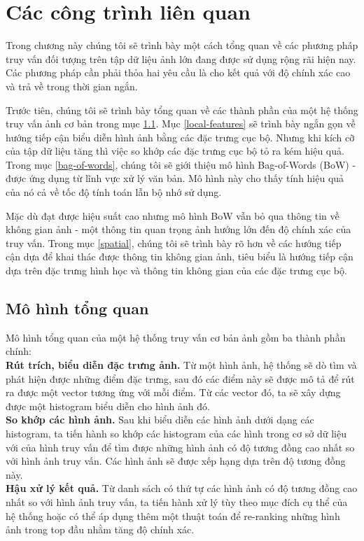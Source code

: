 \chapter{Các công trình liên quan}
\label{chapter:related}
\ifpdf
    \graphicspath{{Chapter2/Chapter2Figs/PNG/}{Chapter2/Chapter2Figs/PDF/}{Chapter2/Chapter2Figs/}}
\else
    \graphicspath{{Chapter2/Chapter2Figs/EPS/}{Chapter2/Chapter2Figs/}}
\fi


Trong chương này chúng tôi sẽ trình bày một cách tổng quan về các phương pháp truy vấn đối tượng trên tập dữ liệu ảnh lớn đang được sử dụng rộng rãi hiện nay. Các phương pháp cần phải thỏa hai yêu cầu là cho kết quả với độ chính xác cao và trả về trong thời gian ngắn.

Trước tiên, chúng tôi sẽ trình bày tổng quan về các thành phần của một hệ thống truy vấn ảnh cơ bản trong mục \ref{section:overall}. Mục \ref{local-features} sẽ trình bày ngắn gọn về hướng tiếp cận biểu diễn hình ảnh bằng các đặc trưng cục bộ. Nhưng khi kích cỡ của tập dữ liệu tăng thì việc so khớp các đặc trưng cục bộ tỏ ra kém hiệu quả. Trong mục \ref{bag-of-words}, chúng tôi sẽ giới thiệu mô hình Bag-of-Words (BoW) -  được ứng dụng từ lĩnh vực xử lý văn bản. Mô hình này cho thấy tính hiệu quả của nó cả về tốc độ tính toán lẫn bộ nhớ sử dụng.

Mặc dù đạt được hiệu suất cao nhưng mô hình BoW vẫn bỏ qua thông tin về không gian ảnh - một thông tin quan trọng ảnh hướng lớn đến độ chính xác của truy vấn. Trong mục \ref{spatial}, chúng tôi sẽ trình bày rõ hơn về các hướng tiếp cận dựa để khai thác được thông tin không gian ảnh, tiêu biểu là hướng tiếp cận dựa trên đặc trưng hình học và thông tin không gian của các đặc trưng cục bộ.

\section{Mô hình tổng quan}
\label{section:overall}
Mô hình tổng quan của một hệ thống truy vấn cơ bản ảnh gồm ba thành phần chính:\\
\textbf{Rút trích, biểu diễn đặc trưng ảnh.} Từ một hình ảnh, hệ thống sẽ dò tìm và phát hiện được những điểm đặc trưng, sau đó các điểm này sẽ được mô tả để rút ra được một vector tương ứng với mỗi điểm. Từ các vector đó, ta sẽ xây dựng được một histogram biểu diễn cho hình ảnh đó.\\
\textbf{So khớp các hình ảnh.} Sau khi biểu diễn các hình ảnh dưới dạng các histogram, ta tiến hành so khớp các histogram của các hình trong cơ sở dữ liệu với của hình truy vấn để tìm được những hình ảnh có độ tương đồng cao nhất so với hình ảnh truy vấn. Các hình ảnh sẽ được xếp hạng dựa trên độ tương đồng này.\\
\textbf{Hậu xử lý kết quả.} Từ danh sách có thứ tự các hình ảnh có độ tương đồng cao nhất so với hình ảnh truy vấn, ta tiến hành xử lý tùy theo mục đích cụ thể của hệ thống hoặc có thể áp dụng thêm một thuật toán để re-ranking những hình ảnh trong top đầu nhằm tăng độ chính xác.

